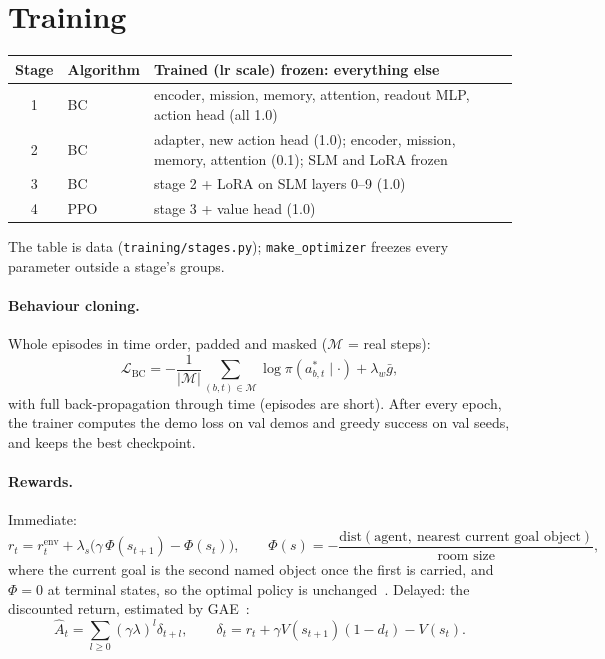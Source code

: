 \documentclass[11pt,a4paper]{article}
\newcommand{\code}[1]{\texttt{\small #1}}
\begin{document}
\section{Training}
\label{sec:training}

\begin{center}
\small
\begin{tabularx}{\linewidth}{@{}cp{1.6cm}X@{}}
\toprule
Stage & Algorithm & Trained (lr scale) \hfill frozen: everything else \\
\midrule
1 & BC & encoder, mission, memory, attention, readout MLP, action head (all 1.0) \\
2 & BC & adapter, new action head (1.0); encoder, mission, memory, attention (0.1); SLM and LoRA frozen \\
3 & BC & stage 2 + LoRA on SLM layers 0--9 (1.0) \\
4 & PPO & stage 3 + value head (1.0) \\
\bottomrule
\end{tabularx}
\end{center}
The table is data (\code{training/stages.py}); \code{make\_optimizer} freezes every parameter outside a stage's groups.

\paragraph{Behaviour cloning.} Whole episodes in time order, padded and masked ($\mathcal{M}$ = real steps):
\begin{equation}
\mathcal{L}_{\text{BC}} = -\frac{1}{|\mathcal{M}|}\sum_{(b,t)\in\mathcal{M}} \log \pi(a^\ast_{b,t}\mid\cdot) + \lambda_w \bar g,
\end{equation}
with full back-propagation through time (episodes are short). After every epoch, the trainer computes the demo loss on
val demos and greedy success on val seeds, and keeps the best checkpoint.

\paragraph{Rewards.} Immediate:
\begin{equation}
r_t = r^{\text{env}}_t + \lambda_s\big(\gamma\,\Phi(s_{t+1}) - \Phi(s_t)\big), \qquad
\Phi(s) = -\frac{\text{dist}(\text{agent},\ \text{nearest current goal object})}{\text{room size}},
\end{equation}
where the current goal is the second named object once the first is carried, and $\Phi = 0$ at terminal
states, so the optimal policy is unchanged~\cite{ng1999shaping}. Delayed: the discounted return, estimated by GAE~\cite{schulman2016gae}:
\begin{equation}
\hat A_t = \sum_{l\ge0} (\gamma\lambda)^l \delta_{t+l}, \qquad \delta_t = r_t + \gamma V(s_{t+1})(1-d_t) - V(s_t).
\end{equation}
\end{document}
